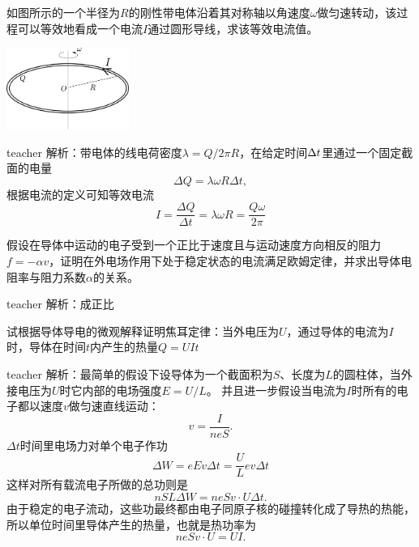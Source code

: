 \begin{example}
如图所示的一个半径为$R$的刚性带电体沿着其对称轴以角速度$\omega$做匀速转动，该过程可以等效地看成一个电流$I$通过圆形导线，求该等效电流值。
\begin{flushright}
\includegraphics[width = 0.3\textwidth]{images/elec-current-1.pdf} 
\end{flushright}

\begin{taggedblock}{teacher}
\noindent
解析：带电体的线电荷密度$\lambda = Q/2\pi R$，在给定时间$\Delta t$里通过一个固定截面的电量
\[\Delta Q = \lambda \omega R \Delta t,\]
根据电流的定义可知等效电流
\[ I=\frac{\Delta Q}{\Delta t}=\lambda \omega R = \frac{Q\omega}{2\pi} \]
\end{taggedblock}
\end{example}

\begin{example}
	假设在导体中运动的电子受到一个正比于速度且与运动速度方向相反的阻力$f = -\alpha v$，证明在外电场作用下处于稳定状态的电流满足欧姆定律，并求出导体电阻率与阻力系数$\alpha$的关系。
	\begin{taggedblock}{teacher}
		\newline
		解析：成正比
	\end{taggedblock}
\end{example}%

\begin{example}
试根据导体导电的微观解释证明焦耳定律：当外电压为$U$，通过导体的电流为$I$时，导体在时间$t$内产生的热量$Q=UIt$
\begin{taggedblock}{teacher}
\newline
解析：最简单的假设下设导体为一个截面积为$S$、长度为$L$的圆柱体，当外接电压为$U$时它内部的电场强度$E=U/L$。
并且进一步假设当电流为$I$时所有的电子都以速度$v$做匀速直线运动：
\[ v=\frac{I}{neS}. \]
$\Delta t$时间里电场力对单个电子作功
\[\Delta W =  eEv\Delta t =\frac{U}{L}ev\Delta t\]
这样对所有载流电子所做的总功则是
\[ nSL\Delta W = neSv\cdot U\Delta t .\]
由于稳定的电子流动，这些功最终都由电子同原子核的碰撞转化成了导热的热能，所以单位时间里导体产生的热量，也就是热功率为
\[neSv\cdot U = UI. \]
\end{taggedblock}
\end{example}


